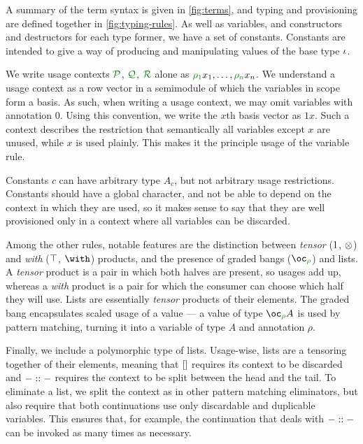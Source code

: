 A summary of the term syntax is given in \autoref{fig:terms}, and typing and
provisioning are defined together in \autoref{fig:typing-rules}.
As well as variables, and constructors and destructors for each type former, we
have a set of constants.
Constants are intended to give a way of producing and manipulating values of the
base type $\iota$.

We write usage contexts $\resctx P$, $\resctx Q$, $\resctx R$ alone as
$\rescomment{\rho_1}x_1, \ldots, \rescomment{\rho_n}x_n$.
We understand a usage context as a row vector in a semimodule of which the
variables in scope form a basis.
As such, when writing a usage context, we may omit variables with annotation
$0$.
Using this convention, we write the $x$th basis vector as $1x$.
Such a context describes the restriction that semantically all variables except
$x$ are unused, while $x$ is used plainly.
This makes it the principle usage of the variable rule.

Constants $c$ can have arbitrary type $A_c$, but not arbitrary usage
restrictions.
Constants should have a global character, and not be able to depend on the
context in which they are used, so it makes sense to say that they are well
provisioned only in a context where all variables can be discarded. 

Among the other rules, notable features are the distinction between
\emph{tensor} ($1$, $\otimes$) and \emph{with} ($\top$,
$\withT{}{}$) products, and the presence of graded bangs ($\excl{\rho}{}$) and
lists.
A \emph{tensor} product is a pair in which both halves are present, so usages
add up, whereas a \emph{with} product is a pair for which the consumer can
choose which half they will use.
Lists are essentially \emph{tensor} products of their elements.
The graded bang encapsulates scaled usage of a value --- a value of type
$\excl{\rho}{A}$ is used by pattern matching, turning it into a variable of type
$A$ and annotation $\rho$.

Finally, we include a polymorphic type of lists.
Usage-wise, lists are a tensoring together of their elements, meaning that
$[]$ requires its context to be discarded and $- :: -$ requires the
context to be split between the head and the tail.
To eliminate a list, we split the context as in other pattern matching
eliminators, but also require that both continuations use only discardable
and duplicable variables.
This ensures that, for example, the continuation that deals with $- :: -$
can be invoked as many times as necessary.


